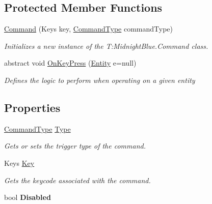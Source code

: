 \subsection*{Protected Member Functions}
\begin{DoxyCompactItemize}
\item 
\hyperlink{class_m_b2_d_1_1_i_o_1_1_command_a9cb2200e1b56437406cb300a782a425f}{Command} (Keys key, \hyperlink{namespace_m_b2_d_1_1_i_o_ab5f95f3fe9e652778b62bdf943168a68}{Command\+Type} command\+Type)
\begin{DoxyCompactList}\small\item\em Initializes a new instance of the T\+:\+Midnight\+Blue.\+Command class. \end{DoxyCompactList}\item 
abstract void \hyperlink{class_m_b2_d_1_1_i_o_1_1_command_ae927e36c0e285848325cc68eddb5fd72}{On\+Key\+Press} (\hyperlink{class_m_b2_d_1_1_entity_component_1_1_entity}{Entity} e=null)
\begin{DoxyCompactList}\small\item\em Defines the logic to perform when operating on a given entity \end{DoxyCompactList}\end{DoxyCompactItemize}
\subsection*{Properties}
\begin{DoxyCompactItemize}
\item 
\hyperlink{namespace_m_b2_d_1_1_i_o_ab5f95f3fe9e652778b62bdf943168a68}{Command\+Type} \hyperlink{class_m_b2_d_1_1_i_o_1_1_command_afd1e0b56bee6e683db89a55c3b155f9b}{Type}
\begin{DoxyCompactList}\small\item\em Gets or sets the trigger type of the command. \end{DoxyCompactList}\item 
Keys \hyperlink{class_m_b2_d_1_1_i_o_1_1_command_a42f1ab4c0c10b351e296d23713bd0a6a}{Key}
\begin{DoxyCompactList}\small\item\em Gets the keycode associated with the command. \end{DoxyCompactList}\item 
\hypertarget{class_m_b2_d_1_1_i_o_1_1_command_ade6e24126e6d0d094872513b584de862}{}\label{class_m_b2_d_1_1_i_o_1_1_command_ade6e24126e6d0d094872513b584de862} 
bool {\bfseries Disabled}
\end{DoxyCompactItemize}


